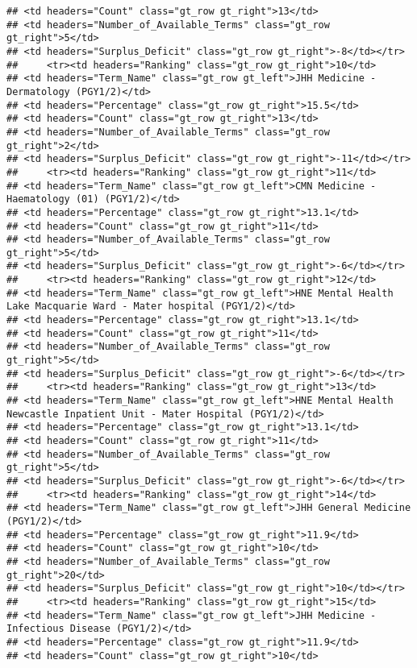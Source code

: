 \documentclass[
]{article}
\begin{document}
\begin{verbatim}
## <td headers="Count" class="gt_row gt_right">13</td>
## <td headers="Number_of_Available_Terms" class="gt_row gt_right">5</td>
## <td headers="Surplus_Deficit" class="gt_row gt_right">-8</td></tr>
##     <tr><td headers="Ranking" class="gt_row gt_right">10</td>
## <td headers="Term_Name" class="gt_row gt_left">JHH Medicine - Dermatology (PGY1/2)</td>
## <td headers="Percentage" class="gt_row gt_right">15.5</td>
## <td headers="Count" class="gt_row gt_right">13</td>
## <td headers="Number_of_Available_Terms" class="gt_row gt_right">2</td>
## <td headers="Surplus_Deficit" class="gt_row gt_right">-11</td></tr>
##     <tr><td headers="Ranking" class="gt_row gt_right">11</td>
## <td headers="Term_Name" class="gt_row gt_left">CMN Medicine - Haematology (01) (PGY1/2)</td>
## <td headers="Percentage" class="gt_row gt_right">13.1</td>
## <td headers="Count" class="gt_row gt_right">11</td>
## <td headers="Number_of_Available_Terms" class="gt_row gt_right">5</td>
## <td headers="Surplus_Deficit" class="gt_row gt_right">-6</td></tr>
##     <tr><td headers="Ranking" class="gt_row gt_right">12</td>
## <td headers="Term_Name" class="gt_row gt_left">HNE Mental Health Lake Macquarie Ward - Mater hospital (PGY1/2)</td>
## <td headers="Percentage" class="gt_row gt_right">13.1</td>
## <td headers="Count" class="gt_row gt_right">11</td>
## <td headers="Number_of_Available_Terms" class="gt_row gt_right">5</td>
## <td headers="Surplus_Deficit" class="gt_row gt_right">-6</td></tr>
##     <tr><td headers="Ranking" class="gt_row gt_right">13</td>
## <td headers="Term_Name" class="gt_row gt_left">HNE Mental Health Newcastle Inpatient Unit - Mater Hospital (PGY1/2)</td>
## <td headers="Percentage" class="gt_row gt_right">13.1</td>
## <td headers="Count" class="gt_row gt_right">11</td>
## <td headers="Number_of_Available_Terms" class="gt_row gt_right">5</td>
## <td headers="Surplus_Deficit" class="gt_row gt_right">-6</td></tr>
##     <tr><td headers="Ranking" class="gt_row gt_right">14</td>
## <td headers="Term_Name" class="gt_row gt_left">JHH General Medicine (PGY1/2)</td>
## <td headers="Percentage" class="gt_row gt_right">11.9</td>
## <td headers="Count" class="gt_row gt_right">10</td>
## <td headers="Number_of_Available_Terms" class="gt_row gt_right">20</td>
## <td headers="Surplus_Deficit" class="gt_row gt_right">10</td></tr>
##     <tr><td headers="Ranking" class="gt_row gt_right">15</td>
## <td headers="Term_Name" class="gt_row gt_left">JHH Medicine - Infectious Disease (PGY1/2)</td>
## <td headers="Percentage" class="gt_row gt_right">11.9</td>
## <td headers="Count" class="gt_row gt_right">10</td>

\end{verbatim}
\end{document}
